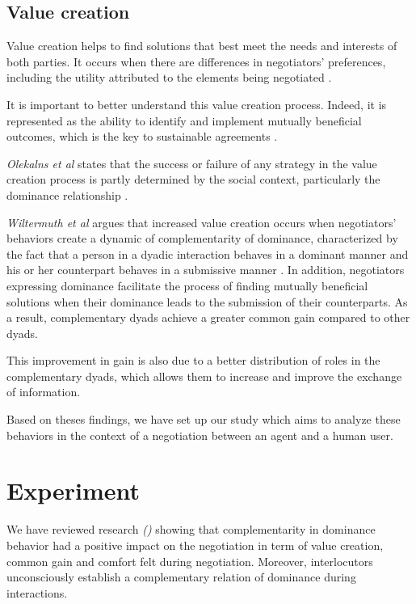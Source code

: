 \documentclass[10pt, a4paper, twocolumn]{article} %
\begin{document}
		\subsection{Value creation}
				
				Value creation helps to find solutions that best meet the needs and interests of both parties. It occurs when there are differences in negotiators' preferences, including the utility attributed to the elements being negotiated \cite{lax1986managerial}. 
				
				It is important to better understand this value creation process. Indeed, it is represented as the ability to identify and implement mutually beneficial outcomes, which is the key to sustainable agreements \cite{wiltermuth2015benefits}.
				
				\emph{Olekalns et al} states that the success or failure of any strategy in the value creation process is partly determined by the social context, particularly the dominance relationship \cite{olekalns2013dyadic}.
				
				\emph{Wiltermuth et al} argues that increased value creation occurs when negotiators' behaviors create a dynamic of complementarity of dominance, characterized by the fact that a person in a dyadic interaction behaves in a dominant manner and his or her counterpart behaves in a submissive manner \cite{wiltermuth2015benefits}. In addition, negotiators expressing dominance facilitate the process of finding mutually beneficial solutions when their dominance leads to the submission of their counterparts. As a result, complementary dyads achieve a greater common gain compared to other dyads.
				
				This improvement in gain is also due to a better distribution of roles in the complementary dyads, which allows them to increase and improve the exchange of information. 

				Based on theses findings, we have set up our study which aims to analyze these behaviors in the context of a negotiation between an agent and a human user.


\section{Experiment}

	We have reviewed research \emph{(\cite{tiedens2003power,dryer1997opposites,wiltermuth2015benefits})} showing that complementarity in dominance behavior had a positive impact on the negotiation in term of value creation, common gain and comfort felt during negotiation. Moreover, interlocutors unconsciously establish a complementary relation of dominance during interactions.
\end{document}
